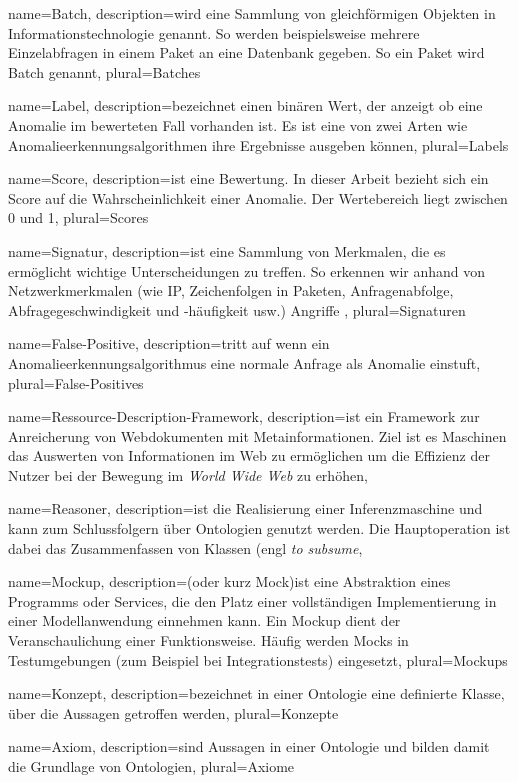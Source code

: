 {
  name={Batch},
  description={wird eine Sammlung von gleichförmigen Objekten in Informationstechnologie genannt. So werden beispielsweise mehrere Einzelabfragen in einem Paket an eine Datenbank gegeben. So ein Paket wird Batch genannt},
  plural={Batches}
}

{
  name={Label},
  description={bezeichnet einen binären Wert, der anzeigt ob eine Anomalie im bewerteten Fall vorhanden ist. Es ist eine von zwei Arten wie Anomalieerkennungsalgorithmen ihre Ergebnisse ausgeben können\cite{ahmed2016survey}},
  plural={Labels}
}

{
  name={Score},
  description={ist eine Bewertung. In dieser Arbeit bezieht sich ein Score auf die Wahrscheinlichkeit einer Anomalie. Der Wertebereich liegt zwischen 0 und 1},
  plural={Scores}
}

{
  name={Signatur},
  description={ist eine Sammlung von Merkmalen, die es ermöglicht wichtige Unterscheidungen zu treffen. So erkennen wir anhand von Netzwerkmerkmalen (wie IP, Zeichenfolgen in Paketen, Anfragenabfolge, Abfragegeschwindigkeit und -häufigkeit usw.) Angriffe \cite{singh2012detecting}},
  plural={Signaturen}
}

{
  name={False-Positive},
  description={tritt auf wenn ein Anomalieerkennungsalgorithmus eine normale Anfrage als Anomalie einstuft},
  plural={False-Positives}
}

{
  name={Ressource-Description-Framework},
  description={ist ein Framework zur Anreicherung von Webdokumenten mit Metainformationen. Ziel ist es Maschinen das Auswerten von Informationen im Web zu ermöglichen um die Effizienz der Nutzer bei der Bewegung im \textit{World Wide Web} zu erhöhen},
}

{
  name={Reasoner},
  description={ist die Realisierung einer Inferenzmaschine und kann zum Schlussfolgern über Ontologien genutzt werden. Die Hauptoperation ist dabei das Zusammenfassen von Klassen (engl \textit{to subsume}},
}

{
  name={Mockup},
  description={(oder kurz Mock)ist eine Abstraktion eines Programms oder Services, die den Platz einer vollständigen Implementierung in einer Modellanwendung einnehmen kann. Ein Mockup dient der Veranschaulichung einer Funktionsweise. Häufig werden Mocks in Testumgebungen (zum Beispiel bei Integrationstests) eingesetzt},
  plural={Mockups}
}

{
  name={Konzept},
  description={bezeichnet in einer Ontologie eine definierte Klasse, über die Aussagen getroffen werden},
  plural={Konzepte}
}

{
  name={Axiom},
  description={sind Aussagen in einer Ontologie und bilden damit die Grundlage von Ontologien},
  plural={Axiome}
}
